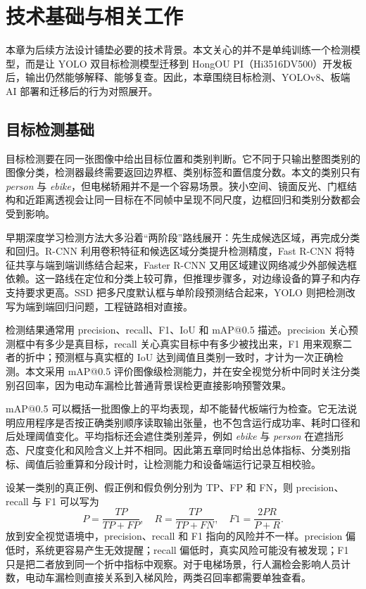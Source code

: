 \chapter{技术基础与相关工作}
\label{cha:background}

本章为后续方法设计铺垫必要的技术背景。本文关心的并不是单纯训练一个检测模型，而是让 YOLO 双目标检测模型迁移到 HongOU PI（Hi3516DV500）开发板后，输出仍然能够解释、能够复查。因此，本章围绕目标检测、YOLOv8、板端 AI 部署和迁移后的行为对照展开。

\section{目标检测基础}

目标检测要在同一张图像中给出目标位置和类别判断。它不同于只输出整图类别的图像分类，检测器最终需要返回边界框、类别标签和置信度分数。本文的类别只有 \textit{person} 与 \textit{ebike}，但电梯轿厢并不是一个容易场景。狭小空间、镜面反光、门框结构和近距离透视会让同一目标在不同帧中呈现不同尺度，边框回归和类别分数都会受到影响。

早期深度学习检测方法大多沿着“两阶段”路线展开：先生成候选区域，再完成分类和回归。R-CNN 利用卷积特征和候选区域分类提升检测精度\cite{girshick2014rcnn}，Fast R-CNN 将特征共享与端到端训练结合起来\cite{girshick2015fast}，Faster R-CNN 又用区域建议网络减少外部候选框依赖\cite{ren2017faster}。这一路线在定位和分类上较可靠，但推理步骤多，对边缘设备的算子和内存支持要求更高。SSD 把多尺度默认框与单阶段预测结合起来\cite{liu2016ssd}，YOLO 则把检测改写为端到端回归问题\cite{redmon2016yolo}，工程链路相对直接。

检测结果通常用 precision、recall、F1、IoU 和 mAP@0.5 描述。precision 关心预测框中有多少是真目标，recall 关心真实目标中有多少被找出来，F1 用来观察二者的折中；预测框与真实框的 IoU 达到阈值且类别一致时，才计为一次正确检测。本文采用 mAP@0.5 评价图像级检测能力，并在安全视觉分析中同时关注分类别召回率，因为电动车漏检比普通背景误检更直接影响预警效果。

mAP@0.5 可以概括一批图像上的平均表现，却不能替代板端行为检查。它无法说明应用程序是否按正确类别顺序读取输出张量，也不包含运行成功率、耗时口径和后处理阈值变化。平均指标还会遮住类别差异，例如 \textit{ebike} 与 \textit{person} 在遮挡形态、尺度变化和风险含义上并不相同。因此第五章同时给出总体指标、分类别指标、阈值后验重算和分段计时，让检测能力和设备端运行记录互相校验。

设某一类别的真正例、假正例和假负例分别为 TP、FP 和 FN，则 precision、recall 与 F1 可以写为
\begin{equation}
    P=\frac{TP}{TP+FP},\quad R=\frac{TP}{TP+FN},\quad F1=\frac{2PR}{P+R}.
\end{equation}
放到安全视觉语境中，precision、recall 和 F1 指向的风险并不一样。precision 偏低时，系统更容易产生无效提醒；recall 偏低时，真实风险可能没有被发现；F1 只是把二者放到同一个折中指标中观察。对于电梯场景，行人漏检会影响人员计数，电动车漏检则直接关系到入梯风险，两类召回率都需要单独查看。

